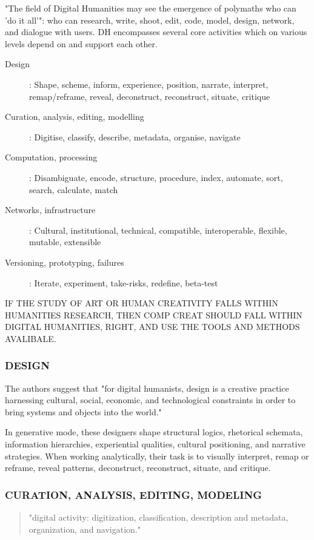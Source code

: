 "The field of Digital Humanities may see the emergence of polymaths who can 'do it all'": who can research, write, shoot, edit, code, model, design, network, and dialogue with users. \citep[p.15]{Burdick2012} DH encompasses several core activities which on various levels depend on and support each other.

\begin{description}
\item [Design]:	Shape, scheme, inform, experience, position, narrate,
					interpret, remap/reframe, reveal, deconstruct, reconstruct,
					situate, critique
\item [Curation, analysis, editing, modelling]:	Digitise, classify, describe, metadata, organise, navigate
\item [Computation, processing]: Disambiguate, encode, structure, procedure, index, automate, sort, search, calculate, match
\item [Networks, infrastructure]:	Cultural, institutional, technical, compatible, interoperable, flexible, mutable, extensible
\item [Versioning, prototyping, failures]:	Iterate, experiment, take-risks, redefine, beta-test
\end{description}

\begin{draft}
IF THE STUDY OF ART OR HUMAN CREATIVITY FALLS WITHIN HUMANITIES RESEARCH, THEN COMP CREAT SHOULD FALL WITHIN DIGITAL HUMANITIES, RIGHT, AND USE THE TOOLS AND METHODS AVALIBALE.
\end{draft}

\subsubsection{DESIGN}
The authors suggest that "for digital humanists, design is a creative practice harnessing cultural, social, economic, and technological constraints in order to bring systems and objects into the world." \citep[p.13]{Burdick2012}

In generative mode, these designers shape structural logics, rhetorical schemata, information hierarchies, experiential qualities, cultural positioning, and narrative strategies. When working analytically, their task is to visually interpret, remap or reframe, reveal patterns, deconstruct, reconstruct, situate, and critique. \citep[p.12]{Burdick2012}

\subsubsection{CURATION, ANALYSIS, EDITING, MODELING}
\begin{quote}
"digital activity: digitization, classification, description and metadata, organization, and navigation." \citep[p.17]{Burdick2012}
\end{quote}

